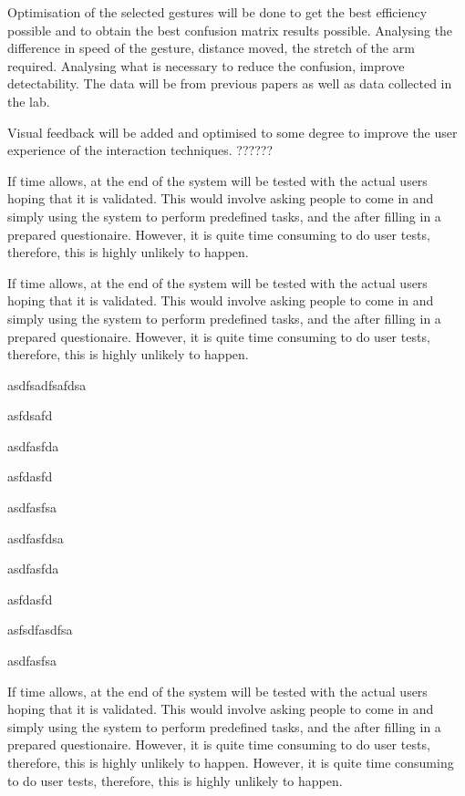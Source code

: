 \documentclass[a4paper, 12pt]{article}
\begin{document}
Optimisation of the selected gestures will be done to get the best efficiency possible and to obtain the best confusion matrix results possible. Analysing the difference in speed of the gesture, distance moved, the stretch of the arm required. Analysing what is necessary to reduce the confusion, improve detectability. The data will be from previous papers as well as data collected in the lab. 

Visual feedback will be added and optimised to some degree to improve the user experience of the interaction techniques.  ??????

If time allows, at the end of the system will be tested with the actual users hoping that it is validated. This would involve asking people to come in and simply using the system to perform predefined tasks, and the after filling in a prepared questionaire. However, it is quite time consuming to do user tests, therefore, this is highly unlikely to happen. 





\newpage
\the\baselineskip
If time allows, at the end of the system will be tested with the actual users hoping that it is validated. This would involve asking people to come in and simply using the system to perform predefined tasks, and the after filling in a prepared questionaire. However, it is quite time consuming to do user tests, therefore, this is highly unlikely to happen. 

asdfsadfsafdsa

asfdsafd

asdfasfda

asfdasfd

asdfasfsa

asdfasfdsa

\vspace{15cm}

asdfasfda

asfdasfd

asfsdfasdfsa

asdfasfsa

If time allows, at the end of the system will be tested with the actual users hoping that it is validated. This would involve asking people to come in and simply using the system to perform predefined tasks, and the after filling in a prepared questionaire. However, it is quite time consuming to do user tests, therefore, this is highly unlikely to happen. However, it is quite time consuming to do user tests, therefore, this is highly unlikely to happen.
\end{document}
